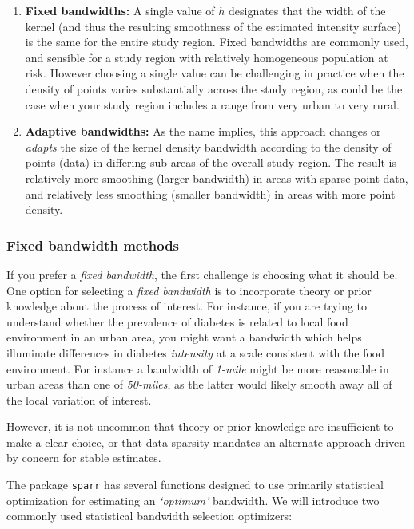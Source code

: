 \documentclass[
]{book}
\providecommand{\tightlist}{%
  \setlength{\itemsep}{0pt}\setlength{\parskip}{0pt}}
\begin{document}
\begin{enumerate}
\def\labelenumi{\arabic{enumi}.}
\tightlist
\item
  \textbf{Fixed bandwidths:} A single value of \(h\) designates that the width of the kernel (and thus the resulting smoothness of the estimated intensity surface) is the same for the entire study region. Fixed bandwidths are commonly used, and sensible for a study region with relatively homogeneous population at risk. However choosing a single value can be challenging in practice when the density of points varies substantially across the study region, as could be the case when your study region includes a range from very urban to very rural.
\item
  \textbf{Adaptive bandwidths:} As the name implies, this approach changes or \emph{adapts} the size of the kernel density bandwidth according to the density of points (data) in differing sub-areas of the overall study region. The result is relatively more smoothing (larger bandwidth) in areas with sparse point data, and relatively less smoothing (smaller bandwidth) in areas with more point density.
\end{enumerate}

\hypertarget{fixed-bandwidth-methods}{%
\subsubsection{Fixed bandwidth methods}\label{fixed-bandwidth-methods}}

If you prefer a \emph{fixed bandwidth}, the first challenge is choosing what it should be. One option for selecting a \emph{fixed bandwidth} is to incorporate theory or prior knowledge about the process of interest. For instance, if you are trying to understand whether the prevalence of diabetes is related to local food environment in an urban area, you might want a bandwidth which helps illuminate differences in diabetes \emph{intensity} at a scale consistent with the food environment. For instance a bandwidth of \emph{1-mile} might be more reasonable in urban areas than one of \emph{50-miles}, as the latter would likely smooth away all of the local variation of interest.

However, it is not uncommon that theory or prior knowledge are insufficient to make a clear choice, or that data sparsity mandates an alternate approach driven by concern for stable estimates.

The package \texttt{sparr} has several functions designed to use primarily statistical optimization for estimating an \emph{`optimum'} bandwidth. We will introduce two commonly used statistical bandwidth selection optimizers:
\end{document}
